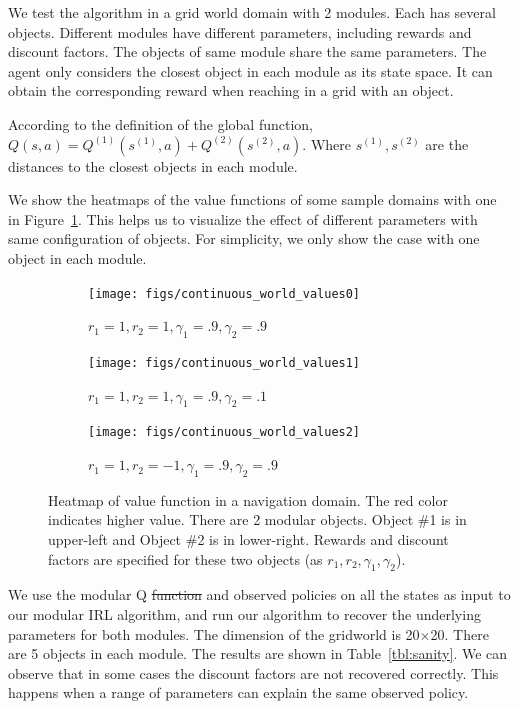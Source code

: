 \documentclass[12pt]{report}	%
\theoremstyle{definition}
\theoremstyle{remark}
\providecommand{\DIFadd}[1]{{\protect\color{blue}\uwave{#1}}} %
\providecommand{\DIFdel}[1]{{\protect\color{red}\sout{#1}}}                      %
\providecommand{\DIFaddbegin}{} %
\providecommand{\DIFaddend}{} %
\providecommand{\DIFdelbegin}{} %
\providecommand{\DIFdelend}{} %
\begin{document}
We test the algorithm in a grid world domain with 2 modules. Each has several
objects. Different modules have different parameters, including rewards and discount
factors. The objects of same module share the same parameters. The agent only
considers the closest object in each module as its state space. It can
obtain the corresponding reward when reaching in a grid with an object.

According to the definition of the global \DIFaddbegin \DIFadd{Q }\DIFaddend function, $Q(s, a) = Q^{(1)}(s^{(1)},
a) + Q^{(2)}(s^{(2)}, a)$. Where $s^{(1)}, s^{(2)}$ are the distances to the
closest objects in each module.

We show the heatmaps of the value functions of some sample domains with one
 in Figure~\ref{fig:sanity}. This helps us to visualize the effect of different
 parameters with same configuration of objects. For simplicity, we only show the
 case with one object in each module.

\begin{figure}
\centering
\begin{subfigure}{0.45\textwidth}
\texttt{[image: figs/continuous\_world\_values0]}
\caption{$r_1=1, r_2=1, \gamma_1=.9, \gamma_2=.9$}
\end{subfigure}

\begin{subfigure}{0.45\textwidth}
\texttt{[image: figs/continuous\_world\_values1]}
\caption{$r_1=1, r_2=1, \gamma_1=.9, \gamma_2=.1$}
\end{subfigure}

\begin{subfigure}{0.45\textwidth}
\texttt{[image: figs/continuous\_world\_values2]}
\caption{$r_1=1, r_2=-1, \gamma_1=.9, \gamma_2=.9$}
\end{subfigure}
\caption{Heatmap of value function in a navigation domain. The red color
indicates higher value. There are 2 modular
objects. Object \#1 is in upper-left and Object \#2 is in lower-right.  Rewards
and discount factors are specified for these two objects (as $r_1, r_2, \gamma_1,
\gamma_2$).}
\label{fig:sanity}
\end{figure}

We use the modular Q \DIFdelbegin \DIFdel{function }\DIFdelend \DIFaddbegin \DIFadd{functions }\DIFaddend and observed policies on all the states as input
to our modular IRL algorithm, and run our algorithm to recover the underlying
parameters for both modules. The dimension of the gridworld is 20$\times$20.
There are 5 objects in each module. The results are shown in Table~\ref{tbl:sanity}.
We can observe that in some cases the discount factors are not recovered
correctly. This happens when a range of parameters can explain the same observed policy.
\end{document}
